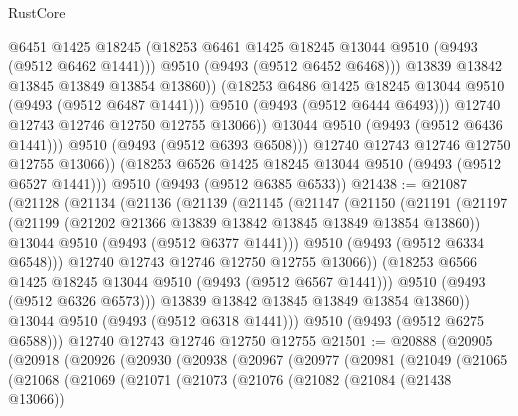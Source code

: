 \begin{lexlean}{RustCore}
\begin{coremodule}
                        @6451
                        @1425
                        @18245
                        (@18253 @6461 @1425 @18245 @13044 @9510 (@9493 (@9512 @6462 @1441)))
                        @9510
                        (@9493 (@9512 @6452 @6468)))
                      @13839
                      @13842
                      @13845
                      @13849
                      @13854
                      @13860))
                  (@18253 @6486 @1425 @18245 @13044 @9510 (@9493 (@9512 @6487 @1441)))
                  @9510
                  (@9493 (@9512 @6444 @6493)))
                @12740
                @12743
                @12746
                @12750
                @12755
                @13066))
            @13044
            @9510
            (@9493 (@9512 @6436 @1441)))
          @9510
          (@9493 (@9512 @6393 @6508)))
        @12740
        @12743
        @12746
        @12750
        @12755
        @13066))
    (@18253 @6526 @1425 @18245 @13044 @9510 (@9493 (@9512 @6527 @1441)))
    @9510
    (@9493 (@9512 @6385 @6533))
@21438 := @21087
    (@21128
      (@21134
        (@21136
          (@21139
            (@21145
              (@21147
                (@21150
                  (@21191
                    (@21197
                      (@21199 (@21202 @21366 @13839 @13842 @13845 @13849 @13854 @13860))
                      @13044
                      @9510
                      (@9493 (@9512 @6377 @1441)))
                    @9510
                    (@9493 (@9512 @6334 @6548)))
                  @12740
                  @12743
                  @12746
                  @12750
                  @12755
                  @13066))
              (@18253 @6566 @1425 @18245 @13044 @9510 (@9493 (@9512 @6567 @1441)))
              @9510
              (@9493 (@9512 @6326 @6573)))
            @13839
            @13842
            @13845
            @13849
            @13854
            @13860))
        @13044
        @9510
        (@9493 (@9512 @6318 @1441)))
      @9510
      (@9493 (@9512 @6275 @6588)))
    @12740
    @12743
    @12746
    @12750
    @12755
@21501 := @20888
    (@20905
      (@20918
        (@20926
          (@20930
            (@20938
              (@20967
                (@20977
                  (@20981
                    (@21049
                      (@21065
                        (@21068
                          (@21069
                            (@21071
                              (@21073
                                (@21076
                                  (@21082
                                    (@21084 (@21438 @13066))

\end{coremodule}
\end{lexlean}
